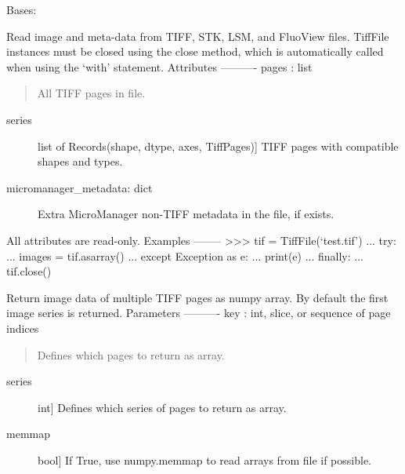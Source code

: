 \documentclass[letterpaper,10pt,english]{sphinxmanual}
\begin{document}
\begin{fulllineitems}
\label{tifffile:tifffile.TiffFile}
Bases: 

Read image and meta-data from TIFF, STK, LSM, and FluoView files.
TiffFile instances must be closed using the close method, which is
automatically called when using the `with' statement.
Attributes
----------
pages : list
\begin{quote}

All TIFF pages in file.
\end{quote}
\begin{description}
\item[{series}] \leavevmode{[}list of Records(shape, dtype, axes, TiffPages){]}
TIFF pages with compatible shapes and types.

\item[{micromanager\_metadata: dict}] \leavevmode
Extra MicroManager non-TIFF metadata in the file, if exists.

\end{description}

All attributes are read-only.
Examples
--------
\textgreater{}\textgreater{}\textgreater{} tif = TiffFile(`test.tif')
... try:
...     images = tif.asarray()
... except Exception as e:
...     print(e)
... finally:
...     tif.close()

\begin{fulllineitems}
\label{tifffile:tifffile.TiffFile.asarray}
Return image data of multiple TIFF pages as numpy array.
By default the first image series is returned.
Parameters
----------
key : int, slice, or sequence of page indices
\begin{quote}

Defines which pages to return as array.
\end{quote}
\begin{description}
\item[{series}] \leavevmode{[}int{]}
Defines which series of pages to return as array.

\item[{memmap}] \leavevmode{[}bool{]}
If True, use numpy.memmap to read arrays from file if possible.

\end{description}


\end{fulllineitems}
\end{fulllineitems}
\end{document}
